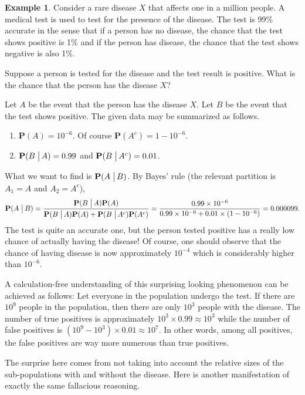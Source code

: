 \documentclass[preprint,  11pt]{amsart}
\theoremstyle{plain} %
\theoremstyle{definition} %
\newtheorem{example}[theorem]{Example}
\begin{document}
\begin{example} Consider a rare disease $X$ that affects one in a million people. A medical test is used to test for the presence of the disease. The test is 99\% accurate in the sense that if a person has no disease, the chance that the test shows positive is 1\% and if the person has disease, the chance that the test shows negative is also 1\%. 

Suppose a person is tested for the disease and the test result is positive. What is the chance that the person has the disease $X$?

Let $A$ be the event that the person has the disease $X$. Let $B$ be the event that the test shows positive. The given data may be summarized as follows.
\begin{enumerate}\setlength\itemsep{6pt}
\item $\mathbf{P}(A)=10^{-6}$. Of course $\mathbf{P}(A^{c})=1-10^{-6}$.
\item $\mathbf{P}(B \left.\vphantom{\hbox{\large (}}\right| A)=0.99$ and $\mathbf{P}(B\left.\vphantom{\hbox{\large (}}\right| A^{c})=0.01$.
\end{enumerate}
What we want to find is $\mathbf{P}(A\left.\vphantom{\hbox{\large (}}\right| B)$. By Bayes' rule (the relevant partition is $A_{1}=A$ and $A_{2}=A^{c}$), 
$$
\mathbf{P}(A\left.\vphantom{\hbox{\large (}}\right| B) = \frac{\mathbf{P}(B\left.\vphantom{\hbox{\large (}}\right| A)\mathbf{P}(A)}{\mathbf{P}(B\left.\vphantom{\hbox{\large (}}\right| A)\mathbf{P}(A)+\mathbf{P}(B\left.\vphantom{\hbox{\large (}}\right| A^{c})\mathbf{P}(A^{c})} = \frac{0.99 \times 10^{-6}}{0.99\times 10^{-6}+0.01\times (1-10^{-6})} = 0.000099.
$$
The test is quite an accurate one, but the person tested positive has a really low chance of actually having the disease! Of course, one should observe that the chance of having disease is now approximately $10^{-4}$ which is considerably higher than $10^{-6}$. 

A calculation-free understanding of this surprising looking phenomenon can be achieved as follows: Let everyone in the population undergo the test. If there are $10^{9}$ people in the population, then there are only $10^{3}$ people with the disease. The number of true positives is approximately $10^{3}\times 0.99\approx 10^{3}$ while the number of false positives is $(10^{9}-10^{3})\times 0.01\approx 10^{7}$. In other words, among all positives, the false positives are way more numerous than true positives.
\end{example}
The surprise here comes from not taking into account the relative sizes of the sub-populations with and without the disease. Here is another manifestation of exactly the same fallacious reasoning.
\end{document}
